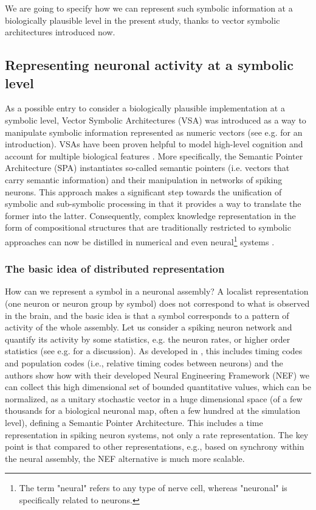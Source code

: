 \documentclass[sn-mathphys]{sn-jnl}
\begin{document}
We are going to specify how we can represent such symbolic information at a biologically plausible level in the present study, thanks to vector symbolic architectures introduced now.

\subsection{Representing neuronal activity at a symbolic level}

As a possible entry to consider a biologically plausible implementation at a symbolic level, Vector Symbolic Architectures (VSA) was introduced as a way to manipulate symbolic information represented as numeric vectors (see e.g. \cite{levy_vector_2008} for an introduction). VSAs have been proven helpful to model high-level cognition and account for multiple biological features \cite{gayler_vector_2003,eliasmith_how_2013}. More specifically, the Semantic Pointer Architecture (SPA) \cite{eliasmith_how_2013} instantiates so-called semantic pointers (i.e. vectors that carry semantic information) and their manipulation in networks of spiking neurons. This approach makes a significant step towards the unification of symbolic and sub-symbolic processing in that it provides a way to translate the former into the latter. Consequently, complex knowledge representation in the form of compositional structures that are traditionally restricted to symbolic approaches can now be distilled in numerical and even neural\footnote{The term "neural" refers to any type of nerve cell, whereas "neuronal" is specifically related to neurons.} systems \cite{crawford_biologically_2016}.

\subsubsection{The basic idea of distributed representation}

How can we represent a symbol in a neuronal assembly? A localist representation (one neuron or neuron group by symbol) does not correspond to what is observed in the brain, and the basic idea is that a symbol corresponds to a pattern of activity of the whole assembly. Let us consider a spiking neuron network and quantify its activity by some statistics, e.g. the neuron rates, or higher order statistics (see e.g. \cite{cessac_dynamics_2008} for a discussion). As developed in \cite{eliasmith_neural_2002}, this includes timing codes and population codes (i.e., relative timing codes between neurons) and the authors show how with their developed Neural Engineering Framework (NEF) we can collect this high dimensional set of bounded quantitative values, which can be normalized, as a unitary stochastic vector in a huge dimensional space (of a few thousands for a biological neuronal map, often a few hundred at the simulation level), defining a Semantic Pointer Architecture. This includes a time representation in spiking neuron systems, not only a rate representation. The key point is that compared to other representations, e.g., based on synchrony within the neural assembly, the NEF alternative is much more scalable.
\end{document}
